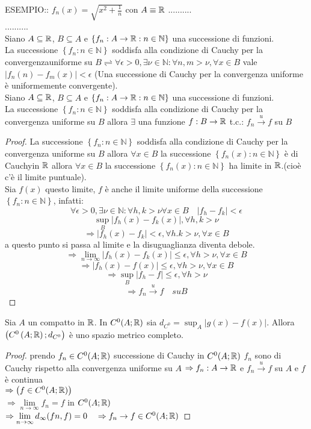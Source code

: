 ESEMPIO:: $f_n(x)=\sqrt{x^2+\frac{1}{n}}$ con $A\equiv \mathbb{R}$
..........\\
..........\\
Siano $A\subseteq \mathbb{R}$, $B\subseteq A$ e $\left\{f_n:A\to \mathbb{R}:n\in\mathbb{N}\right\}$ una successione di funzioni.\\
La successione $\left\{f_n:n\in\mathbb{N}\right\}$ soddisfa alla condizione di Cauchy per la convergenzauniforme su $B \rightleftharpoons \forall\epsilon>0, \exists\nu\in\mathbb{N}: \forall n,m>\nu, \forall x \in B$ vale $\left| f_n(n)-f_m(x) \right|<\epsilon$
\proposition
(Una successione di Cauchy per la convergenza uniforme è uniformemente convergente).\\
Siano $A\subseteq \mathbb{R}$, $B\subseteq A$ e $\left\{ f_n:A\to \mathbb{R}:n\in\mathbb{N} \right\}$ una successione di funzioni.\\
La successione $\left\{ f_n:n\in\mathbb{N} \right\}$ soddisfa alla condizione di Cauchy per la convergenza uniforme su $B$ allora $\exists$ una funzione $f:B\to \mathbb{R}$ t.c.: $f_n\overset{u}{\to}f$ su $B$
\begin{proof}
	La successione $\left\{ f_n:n\in\mathbb{N}\right\}$ soddisfa alla condizione di Cauchy per la convergenza uniforme su $B$ allora $\forall x\in B$ la successione $\left\{ f_n(x) :n\in\mathbb{N} \right\}$ è di Cauchyin $ \mathbb{R}$ allora $\forall x \in B$ la successione $\left\{ f_n(x):n\in\mathbb{N} \right\}$ ha limite in $ \mathbb{R}$.(cioè c'è il limite puntuale).\\
	Sia $f(x)$ questo limite, $f$ è anche il limite uniforme della successione $\left\{ f_n:n\in\mathbb{N} \right\}$, infatti:
	$$\forall\epsilon>0, \exists\nu\in\mathbb{N}: \forall h,k>\nu \forall x\in B \quad \left| f_h-f_k \right|<\epsilon$$
	$$\sup\limits_B\left|f_h(x)-f_k(x)\right|, \forall h,k>\nu$$
	$$\Rightarrow \left|f_h(x)-f_k\right|<\epsilon,\forall h.k>\nu, \forall x \in B$$
	a questo punto si passa al limite e la disuguaglianza diventa debole.
	$$\Rightarrow \lim\limits_{n\to\infty}\left| f_h(x)-f_k(x) \right|\le\epsilon, \forall h>\nu, \forall x\in B$$
	$$\Rightarrow\left| f_h(x)-f(x) \right|\le\epsilon, \forall h>\nu, \forall x\in B$$
	$$\Rightarrow\sup\limits_B\left| f_h-f \right|\le\epsilon, \forall h>\nu$$
	$$\Rightarrow f_n\overset{u}{\to}f\quad su B$$
\end{proof}
\proposition
Sia $A$ un compatto in $ \mathbb{R}$. In $C^0(A; \mathbb{R})$ sia $d_{C^0}=\sup_A\left| g(x)-f(x) \right|$. Allora $\left( C^0\left(A; \mathbb{R}\right);d_{C^0}\right)$ è uno spazio metrico completo.
\begin{proof}
	prendo $f_n\in C^0(A; \mathbb{R})$ successione di Cauchy in $C^0(A; \mathbb{R})$
	$f_n$ sono di Cauchy rispetto alla convergenza uniforme su $A$
	$\Rightarrow f_n:A\to \mathbb{R}$ e $f_n\overset{u}{\to}f$ su $A$ e $f$ è continua\\ $\Rightarrow\left(f\in C^0(A; \mathbb{R})\right)$\\
	$\Rightarrow\lim\limits_{n\to\infty}f_n=f$ in $C^0(A; \mathbb{R})$\\
	$\Rightarrow\lim\limits_{n\to\infty}d_{\infty}(fn,f)=0\quad\Rightarrow f_n\to f\in C^0(A; \mathbb{R})$
\end{proof}
